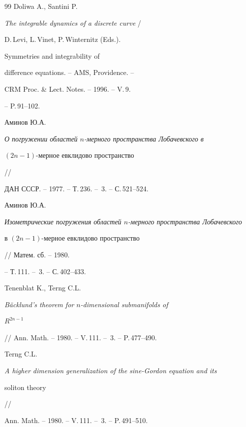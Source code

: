 \begin{thebibliography}{99}
Doliwa A., Santini P.


{\em The integrable dynamics of a discrete curve} /


D.\,Levi, L.\,Vinet, P.\,Winternitz (Eds.).


Symmetries and integrability of


difference equations. -- AMS, Providence. --


CRM Proc. \& Lect. Notes. -- 1996. -- V.\,9.


-- P.\,91--102.


 







Аминов Ю.А.


{\em О погружении областей $n$-мерного пространства Лобачевского в


$(2n-1)$-мер\-ное евклидово пространство} //


ДАН СССР. -- 1977. -- Т.\,236. -- \No\,3. -- С.\,521--524.


 




Аминов Ю.А.


{\em Изометрические погружения областей $n$-мерного пространства Лобачевского


в $(2n-1)$-мерное евклидово пространство} // Матем. сб. -- 1980.


-- Т.\,111. -- \No\,3. -- С.\,402--433.


 




Tenenblat K., Terng C.L.


{\em B\"acklund's theorem for $n$-dimensional submanifolds of 


$R^{2n-1}$} // Ann. Math. -- 1980. -- V.\,111. -- \No\,3. -- P.\,477--490.










Terng C.L.


{\em A higher dimension generalization of the sine-Gordon equation and its


soliton theory} // 


Ann. Math. -- 1980. -- V.\,111. -- \No\,3. -- P.\,491--510.






\end{thebibliography}
